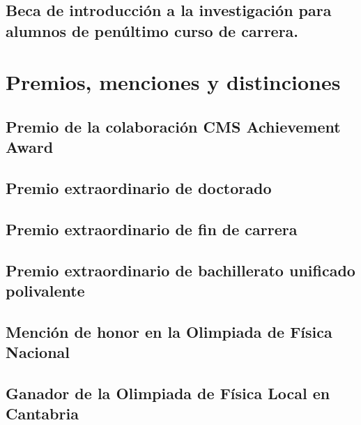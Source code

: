 \documentclass[a4paper, 11pt, twoside, openright]{report}
\begin{document}
\subsection{Beca de introducción a la investigación para alumnos de penúltimo curso de carrera.}



\section{Premios, menciones y distinciones}
\subsection{Premio de la colaboración CMS Achievement Award}

\subsection{Premio extraordinario de doctorado}

\subsection{Premio extraordinario de fin de carrera}

\subsection{Premio extraordinario de bachillerato unificado polivalente}

\subsection{Mención de honor en la Olimpiada de Física Nacional}

\subsection{Ganador de la Olimpiada de Física Local en Cantabria}

\end{document}
